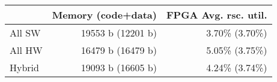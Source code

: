 
\begin{tabular}{lrr}
\toprule
             & Memory (code+data)   & FPGA Avg. rsc. util. \\
\midrule
All SW       &    19553 b (12201 b) &   3.70\% (3.70\%) \\
All HW       &    16479 b (16479 b) &   5.05\% (3.75\%)\\
Hybrid       &    19093 b (16605 b) &   4.24\% (3.74\%)\\
\bottomrule
\end{tabular}

